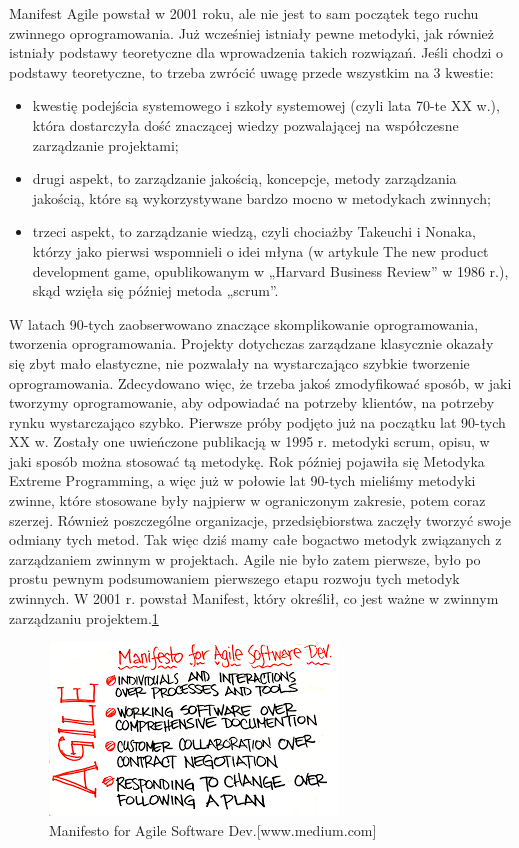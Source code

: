 Manifest Agile powstał w 2001 roku, ale nie jest to sam początek tego ruchu zwinnego oprogramowania. Już wcześniej istniały pewne metodyki, jak również istniały podstawy teoretyczne dla wprowadzenia takich rozwiązań. Jeśli chodzi o podstawy teoretyczne, to trzeba zwrócić uwagę przede wszystkim na 3 kwestie:
	\begin{itemize}
		\item kwestię podejścia systemowego i szkoły systemowej (czyli lata 70-te XX w.), która dostarczyła dość znaczącej wiedzy pozwalającej na współczesne zarządzanie projektami;
		\item drugi aspekt, to zarządzanie jakością, koncepcje, metody zarządzania jakością, które są wykorzystywane bardzo mocno w metodykach zwinnych;
		\item trzeci aspekt, to zarządzanie wiedzą, czyli chociażby Takeuchi i Nonaka, którzy jako pierwsi wspomnieli o idei młyna (w artykule The new product development game, opublikowanym w „Harvard Business Review” w 1986 r.), skąd wzięła się później metoda „scrum”.
	\end{itemize}
W latach 90-tych zaobserwowano znaczące skomplikowanie oprogramowania, tworzenia oprogramowania. Projekty dotychczas zarządzane klasycznie okazały się zbyt mało elastyczne, nie pozwalały na wystarczająco szybkie tworzenie oprogramowania. Zdecydowano więc, że trzeba jakoś zmodyfikować sposób, w jaki tworzymy oprogramowanie, aby odpowiadać na potrzeby klientów, na potrzeby rynku wystarczająco szybko. Pierwsze próby podjęto już na początku lat 90-tych XX w. Zostały one uwieńczone publikacją w 1995 r. metodyki scrum, opisu, w jaki sposób można stosować tą metodykę. Rok później pojawiła się Metodyka Extreme Programming, a więc już w połowie lat 90-tych mieliśmy metodyki zwinne, które stosowane były najpierw w ograniczonym zakresie, potem coraz szerzej. Również poszczególne organizacje, przedsiębiorstwa zaczęły tworzyć swoje odmiany tych metod. Tak więc dziś mamy całe bogactwo metodyk związanych z zarządzaniem zwinnym w projektach.
Agile nie było zatem pierwsze, było po prostu pewnym podsumowaniem pierwszego etapu rozwoju tych metodyk zwinnych. W 2001 r. powstał Manifest, który określił, co jest ważne w zwinnym zarządzaniu projektem.\ref{rys:agile}

\begin{figure}
	\centering\includegraphics[width=.6\textwidth]{img/agile}
	\caption{Manifesto for Agile Software Dev.[www.medium.com]}  \label{rys:agile}%
\end{figure}

